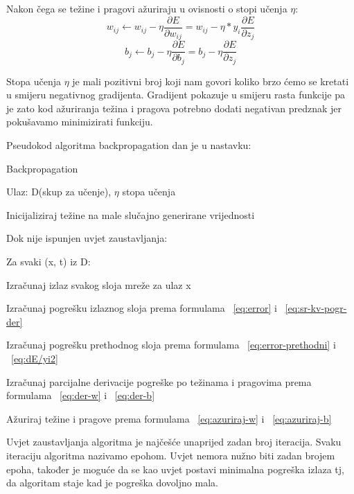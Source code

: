 \documentclass[times, utf8, zavrsni]{fer}
\begin{document}
Nakon čega se težine i pragovi ažuriraju u ovisnosti o stopi učenja $\eta$:
\begin{equation}\label{eq:azuriraj-w}
w_{ij} \leftarrow w_{ij} - \eta\dfrac{\partial E}{\partial w_{ij}} = w_{ij} - \eta * y_i  \dfrac{\partial E}{\partial z_j}
\end{equation}
\begin{equation}\label{eq:azuriraj-b}
b_{j} \leftarrow b_{j} - \eta\dfrac{\partial E}{\partial b_{j}} = b_{j} - \eta \dfrac{\partial E}{\partial z_j}
\end{equation}

Stopa učenja $\eta$ je mali pozitivni broj koji nam govori koliko brzo ćemo se kretati u smijeru negativnog gradijenta. Gradijent pokazuje u smijeru rasta funkcije pa je zato kod ažuriranja težina i pragova potrebno dodati negativan predznak jer pokušavamo minimizirati funkciju.

Pseudokod algoritma backpropagation dan je u nastavku:

\begin{algorithm}
\caption{Backpropagation}
\label{alg:backpropagation}
Ulaz: D(skup za učenje), $\eta$ stopa učenja

Inicijaliziraj težine na male slučajno generirane vrijednosti\;

Dok nije ispunjen uvjet zaustavljanja:\;

Za svaki (x, t) iz D:

Izračunaj izlaz svakog sloja mreže za ulaz x

Izračunaj pogrešku izlaznog sloja prema formulama ~\ref{eq:error} i ~\ref{eq:sr-kv-pogr-der}

Izračunaj pogrešku prethodnog sloja prema formulama ~\ref{eq:error-prethodni} i ~\ref{eq:dE/yi2}

Izračunaj parcijalne derivacije pogreške po težinama i pragovima prema formulama ~\ref{eq:der-w} i ~\ref{eq:der-b}

Ažuriraj težine i pragove prema formulama ~\ref{eq:azuriraj-w} i ~\ref{eq:azuriraj-b}
 	
\end{algorithm}

Uvjet zaustavljanja algoritma je najčešće unaprijed zadan broj iteracija. Svaku iteraciju algoritma nazivamo epohom. Uvjet nemora nužno biti zadan brojem epoha, također je moguće da se kao uvjet postavi minimalna pogreška izlaza tj, da algoritam staje kad je pogreška dovoljno mala.
\end{document}
